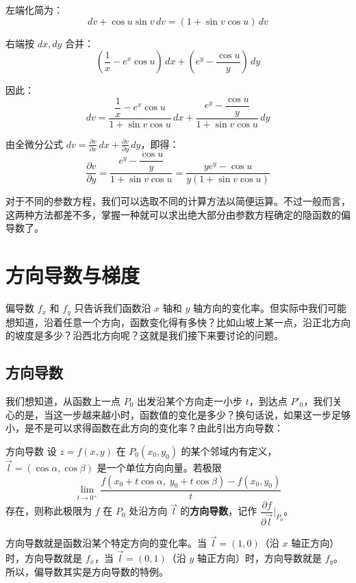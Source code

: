 \begin{myexample}
左端化简为：
\[
dv + \cos u\sin v\,dv = (1 + \sin v\cos u)\,dv
\]

右端按 $dx,dy$ 合并：
\[
(\frac{1}{x} - e^x\cos u)\,dx + (e^y - \frac{\cos u}{y})\,dy
\]

因此：
\[
dv = \frac{\dfrac{1}{x} - e^x\cos u}{1 + \sin v\cos u}\,dx
    + \frac{e^y - \dfrac{\cos u}{y}}{1 + \sin v\cos u}\,dy
\]

由全微分公式 $dv = \frac{\partial v}{\partial x}\,dx + \frac{\partial v}{\partial y}\,dy$，即得：
\[
\frac{\partial v}{\partial y} = \frac{e^y - \dfrac{\cos u}{y}}{1 + \sin v\cos u}
      = \frac{y e^y - \cos u}{y(1 + \sin v\cos u)}
\]

\end{myexample}

对于不同的参数方程，我们可以选取不同的计算方法以简便运算。不过一般而言，这两种方法都差不多，掌握一种就可以求出绝大部分由参数方程确定的隐函数的偏导数了。

\section{方向导数与梯度}
偏导数 $f_x$ 和 $f_y$ 只告诉我们函数沿 $x$ 轴和 $y$ 轴方向的变化率。但实际中我们可能想知道，沿着任意一个方向，函数变化得有多快？比如山坡上某一点，沿正北方向的坡度是多少？沿西北方向呢？这就是我们接下来要讨论的问题。

\subsection{方向导数}
我们想知道，从函数上一点 $P_0$ 出发沿某个方向走一小步 $t$，到达点 $P'_0$，我们关心的是，当这一步越来越小时，函数值的变化是多少？换句话说，如果这一步足够小，是不是可以求得函数在此方向的变化率？由此引出方向导数：

\begin{definition}{方向导数}{}
设 $z = f(x, y)$ 在 $P_0(x_0, y_0)$ 的某个邻域内有定义，$\vec{l} = (\cos\alpha, \cos\beta)$ 是一个单位方向向量。若极限
\[
\lim_{t \to 0^+} \frac{f(x_0 + t\cos\alpha,\; y_0 + t\cos\beta) - f(x_0, y_0)}{t}
\]
存在，则称此极限为 $f$ 在 $P_0$ 处沿方向 $\vec{l}$ 的\textbf{方向导数}，记作 $\dfrac{\partial f}{\partial \vec{l}}\Big|_{P_0}$。
\end{definition}

方向导数就是函数沿某个特定方向的变化率。当 $\vec{l} = (1, 0)$（沿 $x$ 轴正方向）时，方向导数就是 $f_x$，当 $\vec{l} = (0, 1)$（沿 $y$ 轴正方向）时，方向导数就是 $f_y$。所以，偏导数其实是方向导数的特例。


